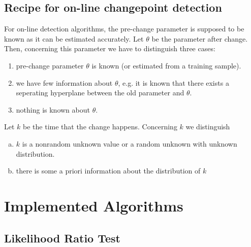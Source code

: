 \documentclass[conference,letterpaper]{IEEEtran}
\begin{document}
\subsection{Recipe for on-line changepoint detection}\label{recipe}

 For on-line detection algorithms, the pre-change parameter is supposed to be known as it can be estimated accurately. Let $\theta$ be the parameter after change. Then, concerning this parameter we have to distinguish three cases:
\begin{enumerate}
\item\label{thetaknown}  pre-change parameter $\theta$ is known (or estimated from a training sample).
\item\label{thetahalfknown} we have few information about $\theta$, e.g. it is known that there exists a seperating hyperplane between the old parameter and $\theta$.
\item\label{thetaunknown} nothing is known about $\theta$.
\end{enumerate}

Let $k$ be the time that the change happens. Concerning $k$ we distinguish
\begin{enumerate}[(a)]
\item\label{kunknown} $k$ is a nonrandom unknown value or a random unknown with unknown distribution.
\item\label{kknown} there is some a priori information about the distribution of $k$ 
\end{enumerate}

\section{Implemented Algorithms}

\subsection{Likelihood Ratio Test}
\end{document}
